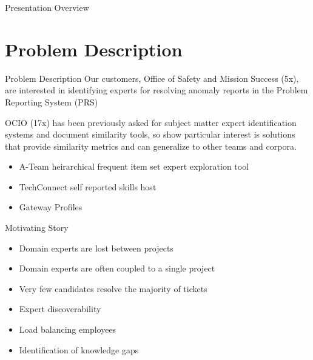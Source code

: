 \documentclass[10pt]{beamer}
\begin{document}
\begin{frame}{Presentation Overview}
  \tableofcontents

\end{frame}



\section{Problem Description}

\begin{frame}{Problem Description}
  Our customers, Office of Safety and Mission Success (5x), are interested in
  identifying experts for resolving anomaly reports in the Problem Reporting System (PRS)

  \vspace{2em}

  OCIO (17x) has been previously asked for subject matter expert
  identification systems and document similarity tools, so show
  particular interest is solutions that provide similarity metrics
  and can generalize to other teams and corpora.


  \begin{itemize}
  \item A-Team heirarchical frequent item set expert exploration tool
  \item TechConnect self reported skills host
  \item Gateway Profiles
  \end{itemize}
\end{frame}

\begin{frame}{Motivating Story}
  \begin{itemize}
  \item Domain experts are lost between projects
  \item Domain experts are often coupled to a single project
  \item Very few candidates resolve the majority of tickets
  \end{itemize}

    \begin{itemize}
  \item Expert discoverability
  \item Load balancing employees
  \item Identification of knowledge gaps
  \end{itemize}


\end{frame}
\end{document}
